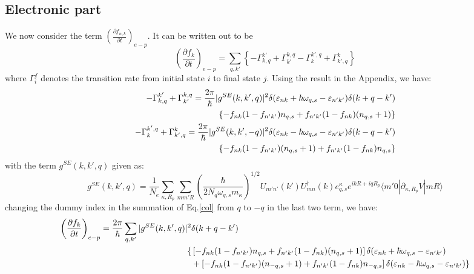 \documentclass{article}
\newcommand{\pfrac}[2]{\frac{\partial #1}{\partial #2}}
\begin{document}
\subsection{Electronic part}
We now consider the term $\left(\pfrac{f_{n,k}}{t}\right)_{e-p}$. It can be written out to be
\begin{equation}
    \left(\pfrac{f_{k}}{t}\right)_{e-p} = \sum_{q,k'} \left\{ - \Gamma_{k,q}^{k'} + \Gamma_{k'}^{k,q} - \Gamma_{k}^{k',q} + \Gamma_{k',q}^{k} \right\} \label{col}
\end{equation}
where $\Gamma_i^f$ denotes the transition rate from initial state $i$ to final state $j$. 
Using the result in the Appendix, we have:
\begin{align}
    - \Gamma_{k,q}^{k'} + \Gamma_{k'}^{k,q} = \frac{2\pi}{\hbar} |g^{SE}(k,k',q)|^2 \delta(\varepsilon_{nk} + \hbar\omega_{q,s} - \varepsilon_{n'k'}) \delta(k+q-k') \notag \\
        \left\{ -f_{nk} (1-f_{n'k'}) n_{q,s} + f_{n'k'} (1-f_{nk}) (n_{q,s}+1) \right\} \label{Gamma1} \\
    - \Gamma_{k}^{k',q} + \Gamma_{k',q}^{k} = \frac{2\pi}{\hbar} |g^{SE}(k,k',-q)|^2 \delta(\varepsilon_{nk} - \hbar\omega_{q,s} - \varepsilon_{n'k'}) \delta(k-q-k') \notag \\
        \left\{ -f_{nk} (1-f_{n'k'}) (n_{q,s}+1) + f_{n'k'} (1-f_{nk}) n_{q,s} \right\} 
\end{align}
with the term $g^{SE}(k,k',q)$ given as:
\begin{equation}
    g^{SE}(k,k',q) = \frac{1}{N_e} \sum_{\kappa, R_p} \sum_{mm'R} \left( \frac{\hbar}{2N_q \omega_{q,s} m_{\kappa}} \right)^{1/2} 
    U_{m'n'}(k') U^{\dagger}_{mn}(k) e_{q,s}^{\kappa} e^{ikR + iqR_p}
             \langle m'0 | \partial_{\kappa, R_p}V | mR \rangle 
\end{equation}
changing the dummy index in the summation of Eq.\ref{col} from $q$ to $-q$ in the last two term, we have:
\begin{align}
    \left(\pfrac{f_{k}}{t}\right)_{e-p} = \frac{2\pi}{\hbar} \sum_{q,k'} |g^{SE}(k,k',q)|^2 & \delta(k+q-k') \notag \\
    \{ &\left[ -f_{nk} (1-f_{n'k'}) n_{q,s} + f_{n'k'} (1-f_{nk}) (n_{q,s}+1)\right] \delta(\varepsilon_{nk} + \hbar\omega_{q,s} - \varepsilon_{n'k'}) \notag \\
       &+ \left[ -f_{nk} (1-f_{n'k'}) (n_{-q,s}+1) + f_{n'k'} (1-f_{nk}) n_{-q,s} \right] \delta(\varepsilon_{nk} - \hbar\omega_{q,s} - \varepsilon_{n'k'}) \}\label{col2}
\end{align}
\end{document}
